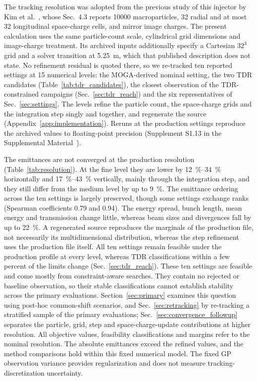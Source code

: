 \documentclass[aps,prab,reprint,superscriptaddress,amsmath,amssymb,floatfix]{revtex4-2}
\begin{document}
The tracking resolution was adopted from the previous study of this injector by Kim et
al.~\cite{Kim2024KLSMOGA}, whose Sec.~4.3 reports \num{10000} macroparticles, 32 radial and
at most 32 longitudinal space-charge cells, and mirror image charges. The present calculation
uses the same particle-count scale, cylindrical grid dimensions and image-charge treatment.
Its archived inputs additionally specify a Cartesian \(32^3\) grid and a solver transition at
\SI{5.25}{\metre}, which that published description does not state. No refinement
residual is quoted there, so we re-tracked ten reported settings at 15 numerical levels: the
MOGA-derived nominal setting, the two TDR candidates (Table~\ref{tab:tdr_candidates}), the
closest observation of the TDR-constrained campaigns (Sec.~\ref{sec:tdr_reach}) and the six
representatives of Sec.~\ref{sec:settings}. The levels refine the particle count, the
space-charge grids and the integration step singly and together, and regenerate the source
(Appendix~\ref{app:implementation}). Reruns at the production settings reproduce the
archived values to floating-point precision (Supplement S1.13 in the Supplemental
Material~\cite{SupplementalMaterial}).

The emittances are not converged at the production resolution (Table~\ref{tab:resolution}). At
the fine level they are lower by \SIrange{12}{34}{\percent} horizontally and
\SIrange{17}{43}{\percent} vertically, mainly through the integration step, and they still
differ from the medium level by up to \SI{9}{\percent}. The emittance ordering across the ten
settings is largely preserved, though some settings exchange ranks (Spearman coefficients 0.79
and 0.94). The energy spread, bunch length, mean energy and transmission change little, whereas
beam sizes and divergences fall by up to \SI{22}{\percent}. A regenerated source reproduces the
marginals of the production file, not necessarily its multidimensional distribution, whereas the
step refinement uses the production file itself. All ten settings remain feasible under the
production profile at every level, whereas TDR classifications within a few percent of the
limits change (Sec.~\ref{sec:tdr_reach}). These ten settings are feasible and come mostly from
constraint-aware searches. They contain no rejected or baseline observation, so their stable
classifications cannot establish stability across the primary evaluations.
Section~\ref{sec:primary} examines this question using post-hoc common-shift scenarios, and
Sec.~\ref{sec:retracking} by re-tracking a stratified sample of the primary evaluations;
Sec.~\ref{sec:convergence_followup} separates the particle, grid, step and space-charge-update
contributions at higher resolution. All
objective values, feasibility classifications and margins refer to the nominal resolution. The
absolute emittances exceed the refined values, and the method comparisons hold within this fixed
numerical model. The fixed GP observation variance provides regularization and does not measure
tracking-discretization uncertainty.
\end{document}
